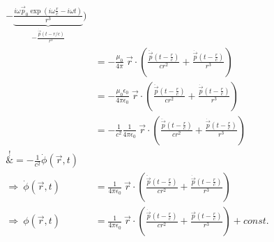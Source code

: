\documentclass[11pt a4paper]{article}
\newcommand{\epsz}{\epsilon_0}
\begin{document}
\begin{align*}
		 - \underbrace{\frac{i \omega \vec p_0 \exp\left(i\omega\frac rc - i\omega t\right)}{r^3}}
		 _{- \frac{\dot{\vec p}(t - r/c)}{r^3}}
		\Bigg) \\
	&= 
		- \frac{\mu_0}{4\pi}  \ \vec r \cdot 
		\left(
			\frac{\ddot{\vec p} \left(t - \frac rc \right)}{cr^2} 
			+ \frac{\dot{\vec p}\left( t - \frac rc \right)}{r^3}
		\right) \\
	&= 
		- \frac{\mu_0\epsz}{4\pi\epsz}  \ \vec r \cdot 
		\left(
			\frac{\ddot{\vec p} \left(t - \frac rc \right)}{cr^2} 
			+ \frac{\dot{\vec p}\left( t - \frac rc \right)}{r^3}
		\right) \\
	&= 
		- \frac{1}{c^2} \frac{1}{4\pi\epsz}  \ \vec r \cdot 
		\left(
			\frac{\ddot{\vec p} \left(t - \frac rc \right)}{cr^2} 
			+ \frac{\dot{\vec p}\left( t - \frac rc \right)}{r^3}
		\right) \\
	\overset{!}&{=} - \frac{1}{c^2} \dot \phi(\vec r, t) \\
	\Rightarrow \
	\dot \phi(\vec r, t)
	&= 
		\frac{1}{4\pi\epsz}  \ \vec r \cdot 
		\left(
			\frac{\ddot{\vec p} \left(t - \frac rc \right)}{cr^2} 
			+ \frac{\dot{\vec p}\left( t - \frac rc \right)}{r^3}
		\right) \\
	\Rightarrow \
	\phi(\vec r, t)
	&= 
		\frac{1}{4\pi\epsz}  \ \vec r \cdot 
		\left(
			\frac{\dot{\vec p} \left(t - \frac rc \right)}{cr^2} 
			+ \frac{\vec p\left( t - \frac rc \right)}{r^3}
		\right) + const.
\end{align*}
\end{document}

